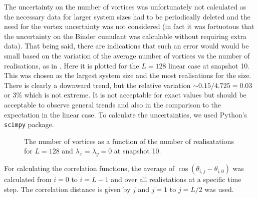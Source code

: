 The uncertainty on the number of vortices was unfortunately not calculated as the necessary data for larger system sizes had to be periodically deleted and the need for the vortex uncertainty was not considered (in fact it was fortuotous that the uncertainty on the Binder cumulant was calculable without requiring extra data). That being said, there are indications that such an error would would be small based on the variation of the average number of vortices vs the number of realisations, as in \fig{\ref{fig:vortex_run}}. Here it is plotted for the $L=128$ linear case at snapshot 10. This was chosen as the largest system size and the most realisations for the size. There is clearly a downward trend, but the relative variation $\sim 0.15/4.725=0.03$ or 3\% which is not extreme. It is not acceptable for exact values but should be acceptable to observe general trends and also in the comparison to the expectation in the linear case. To calculate the uncertainties, we used Python's \texttt{scimpy} package.

\begin{figure}[htbp!]
\centering
\caption{The number of vortices as a function of the number of realisatations for $L=128$ and $\lambda_x = \lambda_y=0$ at snapshot 10.}
\label{fig:vortex_run}
\end{figure}


For calculating the correlation functions, the average of $\cos(\theta_{i,j} - \theta_{i,0})$ was calculated from $i=0$ to $i=L-1$ and over all realistations at a specific time step. The correlation distance is given by $j$ and $j=1$ to $j=L/2$ was used. 
 



